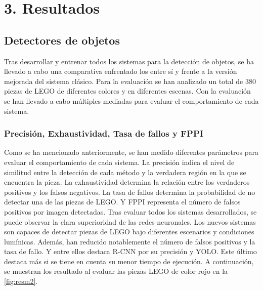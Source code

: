 {\section*{3. Resultados}
\subsection*{Detectores de objetos}
Tras desarrollar y entrenar todos los sistemas para la detección de objetos, se ha llevado a cabo una comparativa enfrentado los entre sí y frente a la versión mejorada del sistema clásico. Para la evaluación se han analizado un total de 380 piezas de LEGO de diferentes colores y en diferentes escenas. Con la evaluación se han llevado a cabo múltiples mediadas para evaluar el comportamiento de cada sistema.

\subsubsection*{Precisión, Exhaustividad, Tasa de fallos y FPPI}
Como se ha mencionado anteriormente, se han medido diferentes parámetros para evaluar el comportamiento de cada sistema. La precisión indica el nivel de similitud entre la detección de cada método y la verdadera región en la que se encuentra la pieza. La exhaustividad determina la relación entre los verdaderos positivos y los falsos negativos. La tasa de fallos determina la probabilidad de no detectar una de las piezas de LEGO. Y FPPI representa el número de falsos positivos por imagen detectadas. Tras evaluar todos los sistemas desarrollados, se puede observar la clara superioridad de las redes neuronales. Los nuevos sistemas son capaces de detectar piezas de LEGO bajo diferentes escenarios y condiciones lumínicas. Además, han reducido notablemente el número de falsos positivos y la tasa de fallo. Y entre ellos destaca R-CNN por su precisión y YOLO. Este último destaca más si se tiene en cuenta su menor tiempo de ejecución. A continuación, se muestran los resultado al evaluar las piezas LEGO de color rojo en la \autoref{fig:resm2}.


}
